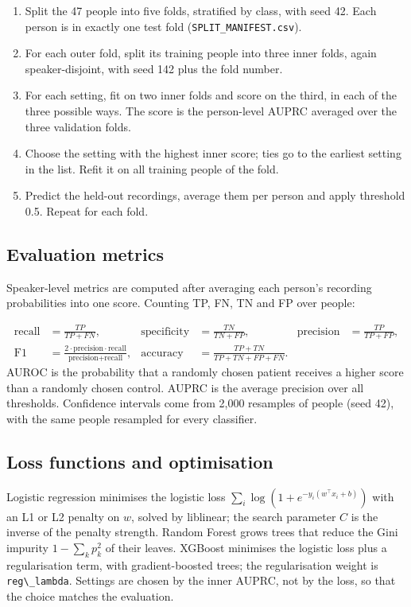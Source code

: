 \documentclass[11pt,a4paper]{article}
\begin{document}
\begin{enumerate}\item Split the 47 people into five folds, stratified by class, with seed 42. Each person is in exactly one test fold (\texttt{SPLIT\_\allowbreak{}MANIFEST.csv}).
\item For each outer fold, split its training people into three inner folds, again speaker-disjoint, with seed 142 plus the fold number.
\item For each setting, fit on two inner folds and score on the third, in each of the three possible ways. The score is the person-level AUPRC averaged over the three validation folds.
\item Choose the setting with the highest inner score; ties go to the earliest setting in the list. Refit it on all training people of the fold.
\item Predict the held-out recordings, average them per person and apply threshold 0.5. Repeat for each fold.
\end{enumerate}
\subsection{Evaluation metrics}\label{sec:metrics}
Speaker-level metrics are computed after averaging each person's recording probabilities into one score. Counting TP, FN, TN and FP over people:

\begin{align*} \text{recall} &= \frac{TP}{TP+FN}, & \text{specificity} &= \frac{TN}{TN+FP}, & \text{precision} &= \frac{TP}{TP+FP}, \\ \text{F1} &= \frac{2\cdot\text{precision}\cdot\text{recall}}{\text{precision}+\text{recall}}, & \text{accuracy} &= \frac{TP+TN}{TP+TN+FP+FN}. \end{align*}
AUROC is the probability that a randomly chosen patient receives a higher score than a randomly chosen control. AUPRC is the average precision over all thresholds. Confidence intervals come from 2,000 resamples of people (seed 42), with the same people resampled for every classifier.

\subsection{Loss functions and optimisation}\label{sec:loss}
Logistic regression minimises the logistic loss $\sum_i \log(1+e^{-y_i(w^\top x_i+b)})$ with an L1 or L2 penalty on $w$, solved by liblinear; the search parameter $C$ is the inverse of the penalty strength. Random Forest grows trees that reduce the Gini impurity $1-\sum_k p_k^2$ of their leaves. XGBoost minimises the logistic loss plus a regularisation term, with gradient-boosted trees; the regularisation weight is \texttt{reg\textbackslash{}\_\allowbreak{}lambda}. Settings are chosen by the inner AUPRC, not by the loss, so that the choice matches the evaluation.
\end{document}
